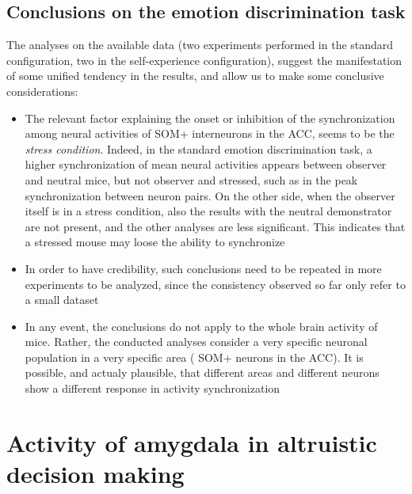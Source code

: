 \documentclass[12pt, a4paper]{report}
\begin{document}
\section{Conclusions on the emotion discrimination task}


The analyses on the available data (two experiments performed in the standard configuration, two in the self-experience configuration), suggest the manifestation of some unified tendency in the results, and allow us to make some conclusive considerations:

\begin{itemize}
	
	\item The relevant factor explaining the onset or inhibition of the synchronization among neural activities of SOM+ interneurons in the ACC, seems to be the \textit{stress condition}. Indeed, in the standard emotion discrimination task, a higher synchronization of mean neural activities appears between observer and neutral mice, but not observer and stressed, such as in the peak synchronization between neuron pairs. On the other side, when the observer itself is in a stress condition, also the results with the neutral demonstrator are not present, and the other analyses are less significant. This indicates that a stressed mouse may loose the ability to synchronize
	
	\item In order to have credibility, such conclusions need to be repeated in more experiments to be analyzed, since the consistency observed so far only refer to a small dataset
	
	\item In any event, the conclusions do not apply to the whole brain activity of mice. Rather, the conducted analyses consider a very specific neuronal population in a very specific area ( SOM+ neurons in the ACC). It is possible, and actualy plausible, that different areas and different neurons show a different response in activity synchronization
	
\end{itemize}





\newpage
\chapter{Activity of amygdala in altruistic decision making}
\end{document}
